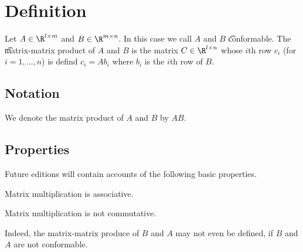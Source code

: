 
\section*{Definition}

Let $A \in \R ^{l \times m}$ and $B \in \R ^{m \times n}$.
In this case we call $A$ and $B$ \t{conformable}.
The \t{matrix-matrix product} of $A$ and $B$ is the matrix $C \in \R ^{l \times n}$ whose $i$th row $c_i$ (for $i = 1, \dots , n$) is defind $c_i = Ab_i$ where $b_i$ is the $i$th row of $B$.

\subsection*{Notation}

We denote the matrix product of $A$ and $B$ by $AB$.

\subsection*{Properties}

Future editions will contain accounts of the following basic properties.

\begin{proposition}
Matrix multiplication is associative.
\end{proposition}

\begin{proposition}
Matrix multiplication is not commutative.
\end{proposition}
Indeed, the matrix-matrix produce of $B$ and $A$ may not even be defined, if $B$ and $A$ are not conformable.

\blankpage